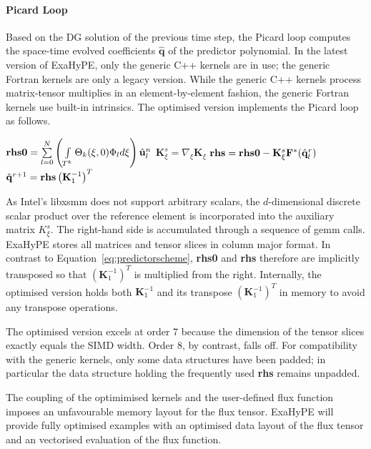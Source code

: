 \documentclass{acm_proc_article-sp}
\begin{document}
\paragraph{Picard Loop}
Based on the DG solution of the previous time step, the Picard loop computes the space-time evolved coefficients $\hat{\mathbf{q}}$ of the predictor polynomial. In the latest version of ExaHyPE, only the generic C++ kernels are in use; the generic Fortran kernels are only a legacy version. While the generic C++ kernels process matrix-tensor multiplies in an element-by-element fashion, the generic Fortran kernels use built-in intrinsics. The optimised version implements the Picard loop as follows.
\begin{algorithmic}
\State $\text{\textbf{rhs0}} = \sum \limits_{l=0}^N\left( \int \limits_{T^k} \Theta_k(\xi,0) \Phi_l d\xi \right) \hat{\mathbf{u}}_l^n$
\State $\mathbf{K}_{\xi}^s = \nabla_{\xi} \mathbf{K}_{\xi} $
\State $\text{\textbf{rhs}} = \text{\textbf{rhs0}} - \mathbf{K}_{\xi}^s \mathbf{F}^*(\hat{\mathbf{q}}_l^r)$
\State $\hat{\mathbf{q}}^{r+1} = \text{\textbf{rhs}} \left(\mathbf{K}_1^{-1}\right)^T$
\EndFor
\end{algorithmic}

As Intel's libxsmm does not support arbitrary scalars, the $d$-dimensional discrete scalar product over the reference element is incorporated into the auxiliary matrix $K_\xi^s$. 
The right-hand side is accumulated through a sequence of gemm calls. ExaHyPE stores all matrices and tensor slices in column major format. In contrast to Equation~\ref{eq:predictorscheme}, \textbf{rhs0} and \textbf{rhs} therefore are implicitly transposed so that $(\mathbf{K}_1^{-1})^T$ is multiplied from the right. Internally, the optimised version holds both $\mathbf{K}_1^{-1}$ and its transpose  $(\mathbf{K}_1^{-1})^T$ in memory to avoid any transpose operations.   %

The optimised version excels at order 7 because the dimension of the tensor slices exactly equals the SIMD width. Order 8, by contrast, falls off. For compatibility with the generic kernels, only some data structures have been padded; in particular the data structure holding the frequently used \textbf{rhs} remains unpadded.

The coupling of the optimimised kernels and the user-defined flux function imposes an unfavourable memory layout for the flux tensor. ExaHyPE will provide fully optimised examples with an optimised data layout of the flux tensor and an vectorised evaluation of the flux function. 
\end{document}
